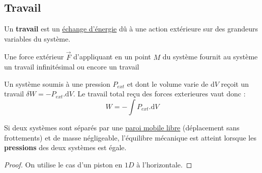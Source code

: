 \documentclass[12pt]{article}
\theoremstyle{cstyle}{\newtheorem{definition}{Définition}[section]}
\theoremstyle{cstyle}{\newtheorem{proposition}[definition]{Propriété}}
\theoremstyle{cstyle}{\newtheorem{theorem}[definition]{Théorème}}
\theoremstyle{mystyle}{\newtheorem{lemma}[definition]{Lemme}}
\theoremstyle{mystyle}{\newtheorem{corollary}[definition]{Corollaire}}
\theoremstyle{mystyle}{\newtheorem*{remark}{Remarque}}
\theoremstyle{mystyle}{\newtheorem*{remarks}{Remarques}}
\theoremstyle{mystyle}{\newtheorem*{example}{Exemple}}
\theoremstyle{mystyle}{\newtheorem*{examples}{Exemples}}
\theoremstyle{definition}{\newtheorem*{exercise}{Exercice}}
\theoremstyle{mystyle}{\newtheorem*{methode}{Méthode}}
\theoremstyle{cstyle}{\newtheorem*{cthm}{}}
\theoremstyle{warn}
\begin{document}
	\begin{minipage}[t]{0.45\textwidth}
		\subsection{Travail}
		
		\begin{definition}[Travail]
			Un \textbf{travail} est un \underline{échange d'énergie} dû à une action extérieure sur des grandeurs variables du système.
		\end{definition}
	
		\begin{proposition}
			Une force extérieur \(\vec{F}\) d'appliquant en un point \(M\) du système fournit au système un travail infinitésimal  ou encore un travail 
		\end{proposition}
	
		\begin{proposition}
			Un système soumis à une pression \(P_{ext}\) et dont le volume varie de d\(V\) reçoit un travail \(\delta W = -P_{ext}.\text{d}V\). Le travail total reçu des forces exterieures vaut donc :
			\[
				W = - \int P_{ext}.\text{d}V 
			\] 
		\end{proposition}
	
		\begin{proposition}
			Si deux systèmes sont séparés par une \underline{paroi mobile libre} (déplacement sans frottements) et de masse négligeable, l'équilibre mécanique est atteint lorsque les \textbf{pressions} des deux systèmes est égale.
		\end{proposition}
	
		\begin{proof}
			On utilise le cas d'un piston en $1D$ à l'horizontale.
		\end{proof}
	
	\end{minipage}
\end{document}
